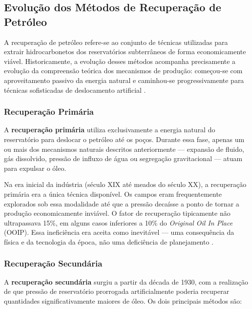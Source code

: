 \documentclass[
  12pt,
  a4paper,
  oneside,
  brazilian,
  sumario=tradicional
]{abntex2}
\begin{document}
\subsection{Evolução dos Métodos de Recuperação de Petróleo}

A recuperação de petróleo refere-se ao conjunto de técnicas utilizadas
para extrair hidrocarbonetos dos reservatórios subterrâneos de forma
economicamente viável. Historicamente, a evolução desses métodos
acompanha precisamente a evolução da compreensão teórica dos
mecanismos de produção: começou-se com aproveitamento passivo da
energia natural e caminhou-se progressivamente para técnicas sofisticadas
de deslocamento artificial \cite{ahmed2010, terry2015, rosa2006}.

\subsubsection{Recuperação Primária}

A \textbf{recuperação primária} utiliza exclusivamente a energia
natural do reservatório para deslocar o petróleo até os poços. Durante
essa fase, apenas um ou mais dos mecanismos naturais descritos
anteriormente — expansão de fluido, gás dissolvido, pressão de influxo
de água ou segregação gravitacional — atuam para expulsar o óleo.

Na era inicial da indústria (século XIX até meados do século XX), a
recuperação primária era a única técnica disponível. Os campos eram
frequentemente explorados sob essa modalidade até que a pressão
decaísse a ponto de tornar a produção economicamente inviável. O fator
de recuperação tipicamente não ultrapassava 15\%, em alguns casos
inferiores a 10\% do \textit{Original Oil In Place} (OOIP). Essa
ineficiência era aceita como inevitável — uma consequência da física
e da tecnologia da época, não uma deficiência de planejamento
\cite{terry2015, rosa2006}.

\subsubsection{Recuperação Secundária}

A \textbf{recuperação secundária} surgiu a partir da década de 1930,
com a realização de que pressão de reservatório prorrogada artificialmente
poderia recuperar quantidades significativamente maiores de óleo. Os
dois principais métodos são:
\end{document}
